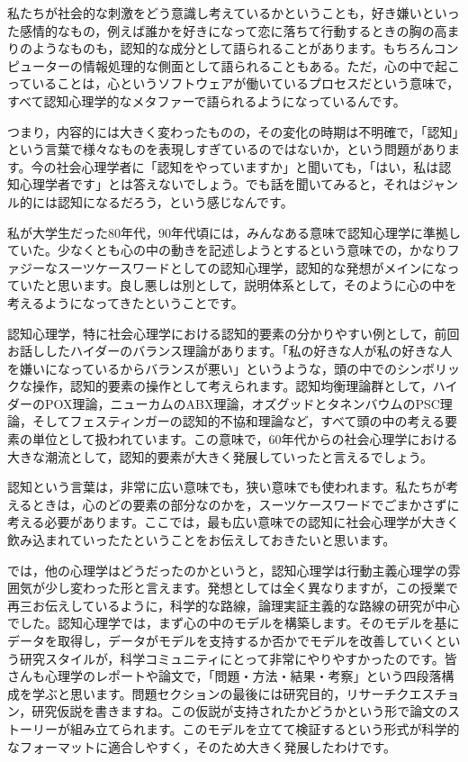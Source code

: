 \documentclass{ltjsbook}
\begin{document}
私たちが社会的な刺激をどう意識し考えているかということも，好き嫌いといった感情的なもの，例えば誰かを好きになって恋に落ちて行動するときの胸の高まりのようなものも，認知的な成分として語られることがあります。もちろんコンピューターの情報処理的な側面として語られることもある。ただ，心の中で起こっていることは，心というソフトウェアが働いているプロセスだという意味で，すべて認知心理学的なメタファーで語られるようになっているんです。

つまり，内容的には大きく変わったものの，その変化の時期は不明確で，「認知」という言葉で様々なものを表現しすぎているのではないか，という問題があります。今の社会心理学者に「認知をやっていますか」と聞いても，「はい，私は認知心理学者です」とは答えないでしょう。でも話を聞いてみると，それはジャンル的には認知になるだろう，という感じなんです。

私が大学生だった80年代，90年代頃には，みんなある意味で認知心理学に準拠していた。少なくとも心の中の動きを記述しようとするという意味での，かなりファジーなスーツケースワードとしての認知心理学，認知的な発想がメインになっていたと思います。良し悪しは別として，説明体系として，そのように心の中を考えるようになってきたということです。

認知心理学，特に社会心理学における認知的要素の分かりやすい例として，前回お話ししたハイダーのバランス理論があります。「私の好きな人が私の好きな人を嫌いになっているからバランスが悪い」というような，頭の中でのシンボリックな操作，認知的要素の操作として考えられます。認知均衡理論群として，ハイダーのPOX理論，ニューカムのABX理論，オズグッドとタネンバウムのPSC理論，そしてフェスティンガーの認知的不協和理論など，すべて頭の中の考える要素の単位として扱われています。この意味で，60年代からの社会心理学における大きな潮流として，認知的要素が大きく発展していったと言えるでしょう。

認知という言葉は，非常に広い意味でも，狭い意味でも使われます。私たちが考えるときは，心のどの要素の部分なのかを，スーツケースワードでごまかさずに考える必要があります。ここでは，最も広い意味での認知に社会心理学が大きく飲み込まれていったたということをお伝えしておきたいと思います。

では，他の心理学はどうだったのかというと，認知心理学は行動主義心理学の雰囲気が少し変わった形と言えます。発想としては全く異なりますが，この授業で再三お伝えしているように，科学的な路線，論理実証主義的な路線の研究が中心でした。認知心理学では，まず心の中のモデルを構築します。そのモデルを基にデータを取得し，データがモデルを支持するか否かでモデルを改善していくという研究スタイルが，科学コミュニティにとって非常にやりやすかったのです。皆さんも心理学のレポートや論文で，「問題・方法・結果・考察」という四段落構成を学ぶと思います。問題セクションの最後には研究目的，リサーチクエスチョン，研究仮説を書きますね。この仮説が支持されたかどうかという形で論文のストーリーが組み立てられます。このモデルを立てて検証するという形式が科学的なフォーマットに適合しやすく，そのため大きく発展したわけです。
\end{document}
